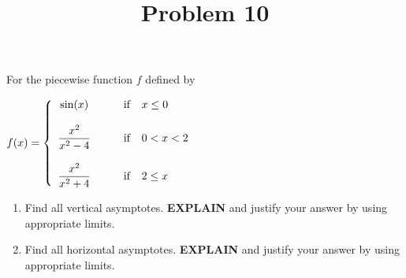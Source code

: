 \documentclass{ximera}
\title[Problem 10]{Problem 10}
\begin{document}
\begin{abstract} \end{abstract}
\maketitle

\begin{problem}
 For the piecewise function $f$ defined by 
 
	$f(x) =   \left\{ \begin{array}{cl}
	\sin(x)		 	&	\qquad \text{if }\hspace{0.1in}  x \leq  0					\\ \\
	\dfrac{x^{2}}{x^{2}-4}	&	\qquad \text{if } \hspace{0.1in}  0< x< 2 	\\ \\
	\dfrac{x^{2}}{x^{2}+4}	&	\qquad \text{if } \hspace{0.1in}  2  \leq x 	
						\end{array} \right.  $
  \begin{enumerate}
    \item Find all vertical asymptotes.   \textbf{EXPLAIN} and justify your answer by using appropriate limits. \\[1em]
	\item Find all horizontal asymptotes. \textbf{EXPLAIN} and justify your answer by using appropriate limits.
\end{enumerate}
    
\end{problem}
\end{document}
